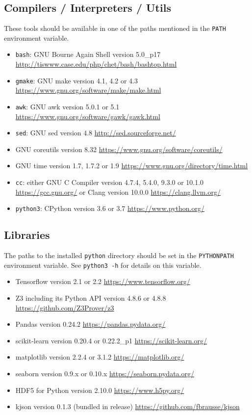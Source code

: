 \documentclass[a4paper,parskip=half]{article} %
\newcommand*\cmdstyle\texttt
\newcommand*\cmd[1]{\cmdstyle{\textcolor{red!85!black}{#1}}}
\begin{document}
\subsection{Compilers / Interpreters / Utils}\label{list:comp-int}
These tools should be available in one of the paths
mentioned in the \texttt{PATH} environment variable.
\begin{itemize}
\item \cmd{bash}: GNU Bourne Again Shell version 5.0\_p17
	\url{http://tiswww.case.edu/php/chet/bash/bashtop.html}
\item \cmd{gmake}: GNU make version 4.1, 4.2 or 4.3
	\url{https://www.gnu.org/software/make/make.html}
\item \cmd{awk}: GNU awk version 5.0.1 or 5.1
	\url{https://www.gnu.org/software/gawk/gawk.html}
\item \cmd{sed}: GNU sed version 4.8
	\url{http://sed.sourceforge.net/}
\item GNU coreutils version 8.32
	\url{https://www.gnu.org/software/coreutils/}
\item GNU time version 1.7, 1.7.2 or 1.9
	\url{https://www.gnu.org/directory/time.html}
\item \cmd{cc}: either GNU C Compiler version 4.7.4, 5.4.0, 9.3.0 or 10.1.0
	\url{https://gcc.gnu.org/}
	or Clang version 10.0.0
	\url{https://clang.llvm.org/}
\item \cmd{python3}: CPython version 3.6 or 3.7
	\url{https://www.python.org/}
\end{itemize}

\subsection{Libraries}\label{list:libs}
The paths to the installed \texttt{python} directory should be set in the
\texttt{PYTHONPATH} environment variable. See \cmd{python3 -h} for details on
this variable.
\begin{itemize}
\item Tensorflow version 2.1 or 2.2 \url{https://www.tensorflow.org/}
\item Z3 including its Python API version 4.8.6 or 4.8.8
	\url{https://github.com/Z3Prover/z3}
\item Pandas version 0.24.2 \url{https://pandas.pydata.org/}
\item scikit-learn version 0.20.4 or 0.22.2\_p1
	\url{https://scikit-learn.org/}
\item matplotlib version 2.2.4 or 3.1.2
	\url{https://matplotlib.org/}
\item seaborn version 0.9.x or 0.10.x
	\url{https://seaborn.pydata.org/}
\item HDF5 for Python version 2.10.0
	\url{https://www.h5py.org/}
\item kjson version 0.1.3 (bundled in release)
	\url{https://github.com/fbrausse/kjson}
\end{itemize}
\end{document}

